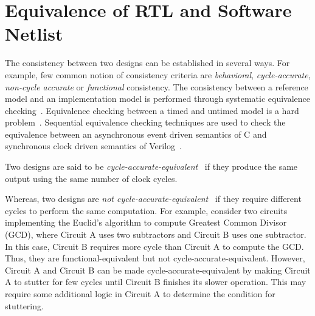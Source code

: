 \section{Equivalence of RTL and Software Netlist}
%
The consistency between two designs can be established in several ways. 
For example, few common notion of consistency criteria are \emph{behavioral}, 
\emph{cycle-accurate}, \emph{non-cycle accurate} or \emph{functional}
consistency.  The consistency between a reference model and an implementation
model is performed through systematic equivalence checking~\cite{}.  Equivalence
checking between a timed and untimed model is a hard
problem~\cite{}.  Sequential equivalence checking techniques are used to check 
the equivalence between an asynchronous event driven semantics of C and synchronous 
clock driven semantics of Verilog~\cite{}.


Two designs are said to be \emph{cycle-accurate-equivalent}~\cite{cycle}  if they produce the same output using the same number of clock cycles.   

Whereas, two designs are \emph{not cycle-accurate-equivalent}~\cite{cycle} if they require 
different cycles to perform the same computation. For example, consider two circuits
implementing the Euclid's algorithm to compute Greatest Common Divisor (GCD),
where Circuit A uses two subtractors and Circuit B uses one subtractor.  In this
case, Circuit B requires more cycle than Circuit A to compute the GCD. Thus,
they are functional-equivalent but not cycle-accurate-equivalent. However,
Circuit A and Circuit B can be made cycle-accurate-equivalent by making Circuit
A to stutter for few cycles until Circuit B finishes its slower operation.  This
may require some additional logic in Circuit A to determine the condition for 
stuttering.  


